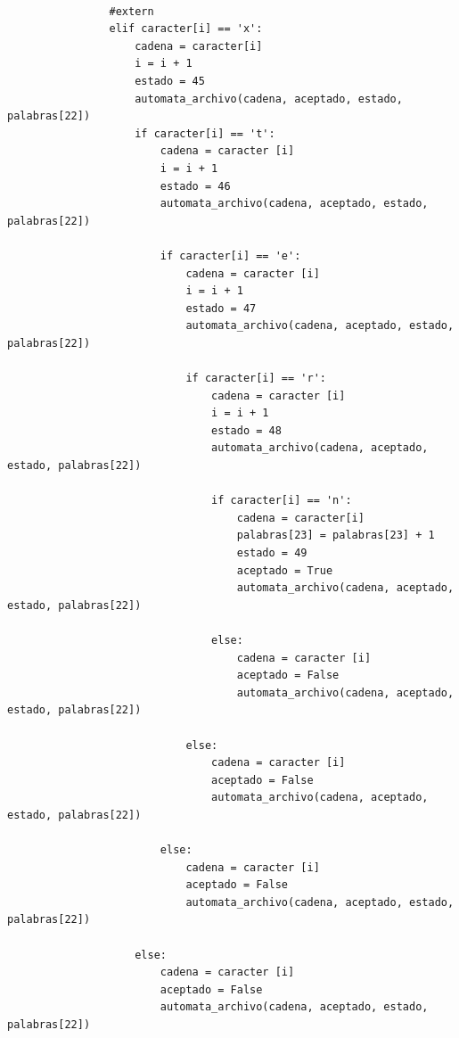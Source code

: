\documentclass{article}
\begin{document}
\begin{flushleft}
\begin{lstlisting}
                
                #extern
                elif caracter[i] == 'x':
                    cadena = caracter[i]
                    i = i + 1
                    estado = 45
                    automata_archivo(cadena, aceptado, estado, palabras[22])
                    if caracter[i] == 't':
                        cadena = caracter [i]
                        i = i + 1
                        estado = 46
                        automata_archivo(cadena, aceptado, estado, palabras[22])              
                        
                        if caracter[i] == 'e':
                            cadena = caracter [i]
                            i = i + 1
                            estado = 47
                            automata_archivo(cadena, aceptado, estado, palabras[22])
                            
                            if caracter[i] == 'r':
                                cadena = caracter [i]
                                i = i + 1
                                estado = 48
                                automata_archivo(cadena, aceptado, estado, palabras[22])
                                
                                if caracter[i] == 'n':
                                    cadena = caracter[i]
                                    palabras[23] = palabras[23] + 1
                                    estado = 49
                                    aceptado = True
                                    automata_archivo(cadena, aceptado, estado, palabras[22])
                                    
                                else:
                                    cadena = caracter [i]
                                    aceptado = False
                                    automata_archivo(cadena, aceptado, estado, palabras[22])
                            
                            else:
                                cadena = caracter [i]
                                aceptado = False
                                automata_archivo(cadena, aceptado, estado, palabras[22])
                                
                        else:
                            cadena = caracter [i]
                            aceptado = False
                            automata_archivo(cadena, aceptado, estado, palabras[22])
                        
                    else:
                        cadena = caracter [i]
                        aceptado = False
                        automata_archivo(cadena, aceptado, estado, palabras[22])
                

\end{lstlisting}
\end{flushleft}
\end{document}
